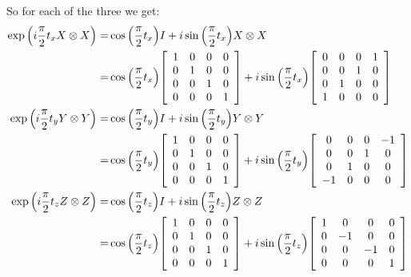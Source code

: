 \documentclass{article}
\begin{document}
So for each of the three we get:
\begin{align*}
  \exp\pqty{i\frac{\pi}{2}t_x X\otimes X} =& \cos\pqty{\frac{\pi}{2}t_x} I + i\sin\pqty{\frac{\pi}{2}t_x} X\otimes X \\
  =& 
  \cos\pqty{\frac{\pi}{2}t_x}
  \bqty{
  \begin{array}{cccc}
    1&0&0&0 \\
    0&1&0&0 \\
    0&0&1&0 \\
    0&0&0&1 \\
  \end{array}
  }
  +
  i\sin\pqty{\frac{\pi}{2}t_x}
  \bqty{
  \begin{array}{cccc}
    0&0&0&1 \\
    0&0&1&0 \\
    0&1&0&0 \\
    1&0&0&0 \\
  \end{array}
  }
  \\
  \exp\pqty{i\frac{\pi}{2}t_y Y\otimes Y} =& \cos\pqty{\frac{\pi}{2}t_y} I + i\sin\pqty{\frac{\pi}{2}t_y} Y\otimes Y \\
  =& 
  \cos\pqty{\frac{\pi}{2}t_y}
  \bqty{
  \begin{array}{cccc}
    1&0&0&0 \\
    0&1&0&0 \\
    0&0&1&0 \\
    0&0&0&1 \\
  \end{array}
  }
  +
  i\sin\pqty{\frac{\pi}{2}t_y}
  \bqty{
  \begin{array}{cccc}
    0&0&0&-1 \\
    0&0&1&0 \\
    0&1&0&0 \\
    -1&0&0&0 \\
  \end{array}
  }
  \\
  \exp\pqty{i\frac{\pi}{2}t_z Z\otimes Z} =& \cos\pqty{\frac{\pi}{2}t_z} I + i\sin\pqty{\frac{\pi}{2}t_z} Z\otimes Z \\
  =& 
  \cos\pqty{\frac{\pi}{2}t_z}
  \bqty{
  \begin{array}{cccc}
    1&0&0&0 \\
    0&1&0&0 \\
    0&0&1&0 \\
    0&0&0&1 \\
  \end{array}
  }
  +
  i\sin\pqty{\frac{\pi}{2}t_z}
  \bqty{
  \begin{array}{cccc}
    1&0&0&0 \\
    0&-1&0&0 \\
    0&0&-1&0 \\
    0&0&0&1 \\
  \end{array}
  }
\end{align*}
\end{document}
